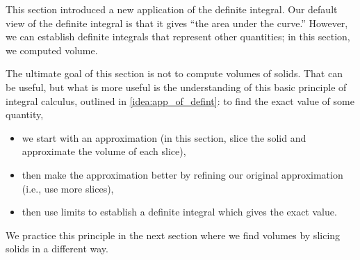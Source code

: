 This section introduced a new application of the definite integral. Our default view of the definite integral is that it gives ``the area under the curve.'' However, we can establish definite integrals that represent other quantities; in this section, we computed volume.

The ultimate goal of this section is not to compute volumes of solids. That can be useful, but what is more useful is the understanding of this basic principle of integral calculus, outlined in \autoref{idea:app_of_defint}: to find the exact value of some quantity, 
\begin{itemize}
	\item we start with an approximation (in this section, slice the solid and approximate the volume of each slice), 
	\item then make the approximation better by refining our original approximation (i.e., use more slices), 
	\item	then use limits to establish a definite integral which gives the exact value.
\end{itemize}

We practice this principle in the next section where we find volumes by slicing solids in a different way.

